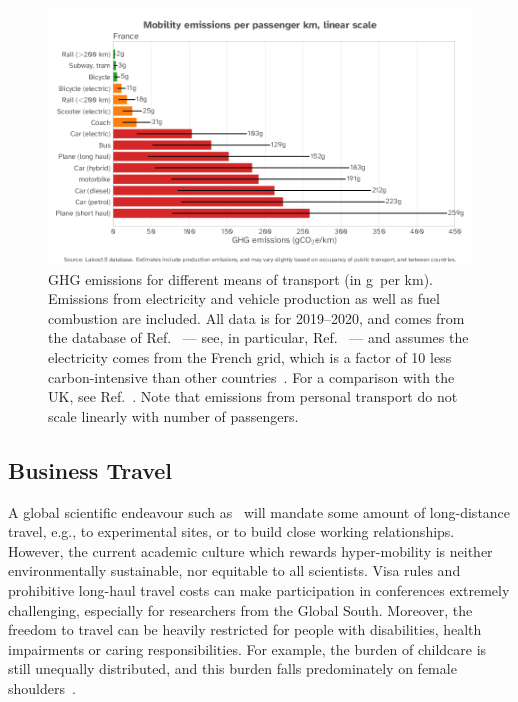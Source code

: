 \documentclass[../SustainableHEP.tex]{subfiles}
\begin{document}
\begin{figure}
    \centering
    \caption[Mobility emissions]{GHG emissions
for different means of transport (in g\CdOe\ per km).  Emissions from electricity and vehicle production as well as fuel combustion are included.  All data is for 2019--2020, and comes from the database of Ref.~\cite{labos1p5} --- see, in particular, Ref.~\cite{labos1p5emi} --- and assumes the electricity comes from the French grid, which is a factor of 10 less carbon-intensive than other countries~\cite{OWDintensity}.  For a comparison with the UK, see Ref.~\cite{OWIDtravel}. Note that emissions from personal transport do not scale linearly with number of passengers.
\label{fig:emiMobility}}
\includegraphics[width=\textwidth]{Sections/Figs/Travel/MobilityEmissionsLinear.png}
\end{figure}


\subsection{Business Travel}

A global scientific endeavour such as \ACR\ will mandate some amount of long-distance travel, e.g., to experimental sites, or to build close working relationships.  However, the current academic culture which rewards hyper-mobility is neither environmentally sustainable, nor equitable to all scientists.  Visa rules and prohibitive long-haul travel costs can make participation in conferences extremely challenging, especially for researchers from the Global South. Moreover, the freedom to travel can be heavily restricted for people with disabilities, health impairments or caring responsibilities. For example, the burden of childcare is still unequally distributed, and this burden falls predominately on female shoulders~\cite{McCarthy}.
\end{document}
